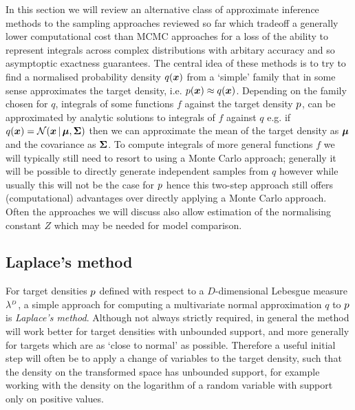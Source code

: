 In this section we will review an alternative class of approximate inference methods to the sampling approaches reviewed so far which tradeoff a generally lower computational cost than \ac{MCMC} approaches for a loss of the ability to represent integrals across complex distributions with arbitary accuracy and so asymptoptic exactness guarantees. The central idea of these methods is to try to find a normalised probability density $q(\boldsymbol{x})$ from a `simple' family that in some sense approximates the target density, i.e. $p(\boldsymbol{x}) \approx q(\boldsymbol{x})$. Depending on the family chosen for $q$, integrals of some functions $f$ against the target density $p$, can be approximated by analytic solutions to integrals of $f$ against $q$ e.g. if $q(\vct{x}) = \nrm{\vct{x} \gvn \vct{\mu},\mtx{\Sigma}}$ then we can approximate the mean of the target density as $\boldsymbol{\mu}$ and the covariance as $\boldsymbol{\Sigma}$. To compute integrals of more general functions $f$ we will typically still need to resort to using a Monte Carlo approach; generally it will be possible to directly generate independent samples from $q$ however while usually this will not be the case for $p$ hence this two-step approach still offers (computational) advantages over directly applying a Monte Carlo approach. Often the approaches we will discuss also allow estimation of the normalising constant $Z$ which may be needed for model comparison.

\subsection{Laplace's method}

For target densities $p$ defined with respect to a $D$-dimensional Lebesgue measure $\lebm{D}$, a simple approach for computing a multivariate normal approximation  $q$ to $p$ is \emph{Laplace's method}. Although not always strictly required, in general the method will work better for target densities with unbounded support, and more generally for targets which are as `close to normal' as possible. Therefore a useful initial step will often be to apply a change of variables to the target density, such that the density on the transformed space has unbounded support, for example working with the density on the logarithm of a random variable with support only on positive values.

